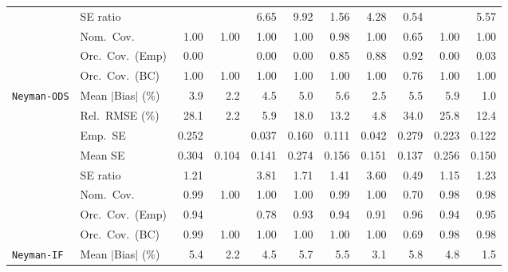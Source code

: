 \begin{landscape}
\begin{longtable}{llrrrrrrrrr}
 & SE ratio &  &  & 6.65 & 9.92 & \cellcolor{ranktwo}1.56 & \cellcolor{rankthree}4.28 & \cellcolor{rankone}0.54 &  & 5.57 \\
 & Nom.\ Cov. & \cellcolor{ranktwo}1.00 & \cellcolor{ranktwo}1.00 & \cellcolor{ranktwo}1.00 & \cellcolor{ranktwo}1.00 & \cellcolor{rankone}0.98 & \cellcolor{ranktwo}1.00 & \cellcolor{rankthree}0.65 & \cellcolor{ranktwo}1.00 & \cellcolor{ranktwo}1.00 \\
 & Orc.\ Cov.\ (Emp) & 0.00 &  & 0.00 & 0.00 & \cellcolor{rankthree}0.85 & \cellcolor{ranktwo}0.88 & \cellcolor{rankone}0.92 & 0.00 & 0.03 \\
 & Orc.\ Cov.\ (BC) & \cellcolor{rankone}1.00 & \cellcolor{rankone}1.00 & \cellcolor{rankone}1.00 & \cellcolor{rankone}1.00 & \cellcolor{rankone}1.00 & \cellcolor{rankone}1.00 & \cellcolor{ranktwo}0.76 & \cellcolor{rankone}1.00 & \cellcolor{rankone}1.00 \\
\addlinespace[2pt]
\quad \texttt{Neyman-ODS} & Mean $|$Bias$|$ (\%) & 3.9 & \cellcolor{ranktwo}2.2 & 4.5 & 5.0 & 5.6 & \cellcolor{rankthree}2.5 & 5.5 & 5.9 & \cellcolor{rankone}1.0 \\
 & Rel.\ RMSE (\%) & 28.1 & \cellcolor{rankone}2.2 & \cellcolor{rankthree}5.9 & 18.0 & 13.2 & \cellcolor{ranktwo}4.8 & 34.0 & 25.8 & 12.4 \\
 & Emp.\ SE & 0.252 &  & 0.037 & 0.160 & 0.111 & 0.042 & 0.279 & 0.223 & 0.122 \\
 & Mean SE & 0.304 & 0.104 & 0.141 & 0.274 & 0.156 & 0.151 & 0.137 & 0.256 & 0.150 \\
 & SE ratio & \cellcolor{ranktwo}1.21 &  & 3.81 & 1.71 & 1.41 & 3.60 & 0.49 & \cellcolor{rankone}1.15 & \cellcolor{rankthree}1.23 \\
 & Nom.\ Cov. & \cellcolor{ranktwo}0.99 & \cellcolor{rankthree}1.00 & \cellcolor{rankthree}1.00 & \cellcolor{rankthree}1.00 & \cellcolor{ranktwo}0.99 & \cellcolor{rankthree}1.00 & 0.70 & \cellcolor{rankone}0.98 & \cellcolor{rankone}0.98 \\
 & Orc.\ Cov.\ (Emp) & \cellcolor{ranktwo}0.94 &  & 0.78 & \cellcolor{rankthree}0.93 & \cellcolor{ranktwo}0.94 & 0.91 & \cellcolor{ranktwo}0.96 & \cellcolor{ranktwo}0.94 & \cellcolor{rankone}0.95 \\
 & Orc.\ Cov.\ (BC) & \cellcolor{ranktwo}0.99 & \cellcolor{rankthree}1.00 & \cellcolor{rankthree}1.00 & \cellcolor{rankthree}1.00 & \cellcolor{rankthree}1.00 & \cellcolor{rankthree}1.00 & 0.69 & \cellcolor{rankone}0.98 & \cellcolor{rankone}0.98 \\
\addlinespace[2pt]
\quad \texttt{Neyman-IF} & Mean $|$Bias$|$ (\%) & 5.4 & \cellcolor{ranktwo}2.2 & 4.5 & 5.7 & 5.5 & \cellcolor{rankthree}3.1 & 5.8 & 4.8 & \cellcolor{rankone}1.5 \\

\end{longtable}
\end{landscape}
